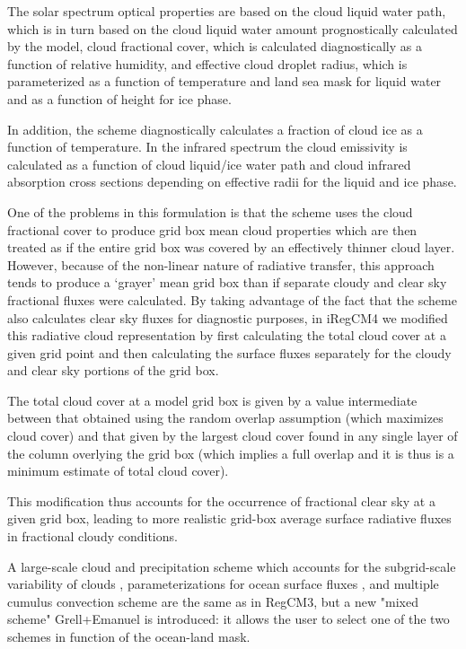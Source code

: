 The solar spectrum optical properties are based on the cloud liquid water path,
which is in turn based on the cloud liquid water amount prognostically
calculated by the model, cloud fractional cover, which is calculated
diagnostically as a function of relative humidity, and effective cloud droplet
radius, which is parameterized as a function of temperature and land sea mask
for liquid water and as a function of height for ice phase.

In addition, the scheme diagnostically calculates a fraction of cloud ice as a
function of temperature. In the infrared spectrum the cloud emissivity is
calculated as a function of cloud liquid/ice water path and cloud infrared
absorption cross sections depending on effective radii for the liquid and ice
phase.

One of the problems in this formulation is that the scheme uses the cloud
fractional cover to produce grid box mean cloud properties which are then
treated as if the entire grid box was covered by an effectively thinner
cloud layer. However, because of the non-linear nature of radiative transfer,
this approach tends to produce a ‘grayer’ mean grid box than if separate
cloudy and clear sky fractional fluxes were calculated. By taking advantage
of the fact that the scheme also calculates clear sky fluxes for diagnostic
purposes, in i\ac{RegCM}4 we modified this radiative cloud representation by
first calculating the total cloud cover at a given grid point and then
calculating the surface fluxes separately for the cloudy and clear sky
portions of the grid box.

The total cloud cover at a model grid box is given by a value
intermediate between that obtained using the random overlap assumption
(which maximizes cloud cover) and that given by the largest cloud cover
found in any single layer of the column overlying the grid box (which implies
a full overlap and it is thus is a minimum estimate of total cloud cover).

This modification thus accounts for the occurrence of fractional clear sky at
a given grid box, leading to more realistic grid-box average surface radiative
fluxes in fractional cloudy conditions.

A large-scale cloud and precipitation scheme which accounts for the
subgrid-scale variability of clouds \citep{Pal_00}, parameterizations for
ocean surface fluxes \citep{Zeng_98}, and multiple cumulus convection scheme
\citep{Kuo_74,Grell_93,Emanuel_91,Emanuel_99} are the same as in \ac{RegCM}3,
but a new "mixed scheme" Grell+Emanuel is introduced: it allows the user to
select one of the two schemes in function of the ocean-land mask.

